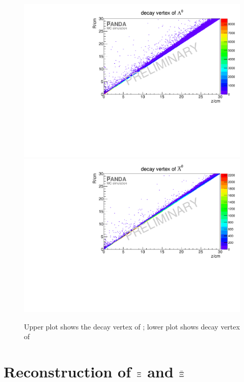 		\begin{figure}
		
			\centering
			\includegraphics[width=1.\textwidth]{./plots/lambda0/lambda0_decay_vtx.pdf}
			\includegraphics[width=1.\textwidth]{./plots/antilambda0/antiLambda0_decay_vtx.pdf}
			\caption{Upper plot shows the decay vertex of \lam; lower plot shows decay vertex of \alam}
			\label{fig:lambda0_antilambda0_decay_vtx}
		
		\end{figure}
		
		
		
		
	
\section{Reconstruction of $\boldmath{\Xi}$ and $\boldmath{\bar{\Xi}}$}
